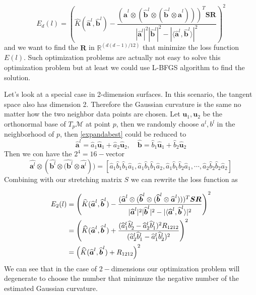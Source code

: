 \documentclass{article}
\begin{document}
\begin{equation}
	E_d(l)= \left(\widehat{K}(\widehat{\boldsymbol{a}}^l,\widehat{\boldsymbol{b}}^l)-\frac{(\widehat{\boldsymbol{a}}^l\otimes(\widehat{\boldsymbol{b}}^l\otimes(\widehat{\boldsymbol{b}}^l\otimes\widehat{\boldsymbol{a}}^l)))^T\boldsymbol{S}\boldsymbol{R}}{|\widehat{\boldsymbol{a}}^l|^2|\widehat{\boldsymbol{b}}^l|^2-|\langle \widehat{\boldsymbol{a}}^l,\widehat{\boldsymbol{b}}^l\rangle|^2}\right)^2
	\label{loss2}
\end{equation}
and we want to find the $\boldsymbol{R}$ in $\mathbb{R}^{(d(d-1)/12)}$ that minimize the loss function $E(l)$. Such optimization problems are actually not easy to solve this optimization problem but at least we could use L-BFGS algorithm to find the solution.
\par
Let's look at a special case in  2-dimension surfaces. In this scenario, the tangent space also has dimension 2. Therefore the Gaussian curvature is the same no matter how the two neighbor data points are chosen. Let $\boldsymbol{u}_1,\boldsymbol{u}_2$ be the orthonormal base of $T_p\mathcal{M}$ at point $p$, then we randomly choose $a^l,b^l$ in the neighborhood of $p$, then \ref{expandabest} could be reduced to 
\begin{equation}
	\widehat{\boldsymbol{a}}^l=\widehat{a}_1\widehat{\boldsymbol{u}}_1+\widehat{a}_2\widehat{\boldsymbol{u}}_2,\quad \widehat{\boldsymbol{b}}=\widehat{b}_1\widehat{\boldsymbol{u}}_1+\widehat{b}_2\widehat{\boldsymbol{u}}_2
\end{equation}
Then we con have the $2^4=16-$vector
\begin{equation}
	\widehat{\boldsymbol{a}^l}\otimes(\widehat{\boldsymbol{b}^l}\otimes\widehat{(\boldsymbol{b}^l}\otimes\widehat{\boldsymbol{a}^l}))=[\widehat{a}_1\widehat{b}_1\widehat{b}_1\widehat{a}_1,\widehat{a}_1\widehat{b}_1\widehat{b}_1\widehat{a}_2,\widehat{a}_1\widehat{b}_1\widehat{b}_2\widehat{a}_1,\cdots,\widehat{a}_2\widehat{b}_2\widehat{b}_2\widehat{a}_2]
\end{equation}
Combining with our stretching matrix $S$ we can rewrite the loss function as

\begin{align}
	\notag
	E_2(l)&=\left(\widehat{K}(\widehat{\boldsymbol{a}}^l,\widehat{\boldsymbol{b}}^l)-\frac{(\widehat{\boldsymbol{a}}^l\otimes(\widehat{\boldsymbol{b}}^l\otimes(\widehat{\boldsymbol{b}}^l\otimes\widehat{\boldsymbol{a}}^l)))^T\boldsymbol{S}\boldsymbol{R}}{|\widehat{\boldsymbol{a}}^l|^2|\widehat{\boldsymbol{b}}^l|^2-|\langle \widehat{\boldsymbol{a}}^l,\widehat{\boldsymbol{b}}^l\rangle|^2}\right)^2 \\
	\notag
	&=\left(\widehat{K}(\widehat{\boldsymbol{a}}^l,\widehat{\boldsymbol{b}}^l)+\frac{(\widehat{a}_1^l\widehat{b}_2^l-\widehat{a}_2^l\widehat{b}_1^l)^2R_{1212}}{(\widehat{a}_2^l\widehat{b}_1^l-\widehat{a}_1^l\widehat{b}_2^l)^2}\right)^2 \\
	&=\left(\widehat{K}(\widehat{\boldsymbol{a}}^l,\widehat{\boldsymbol{b}}^l)+R_{1212}\right)^2 
\end{align}
We can see that in the case of $2-$dimensions our optimization problem will degenerate to choose the number that minimuze the negative number of the estimated Gaussian curvature.


\end{document}
